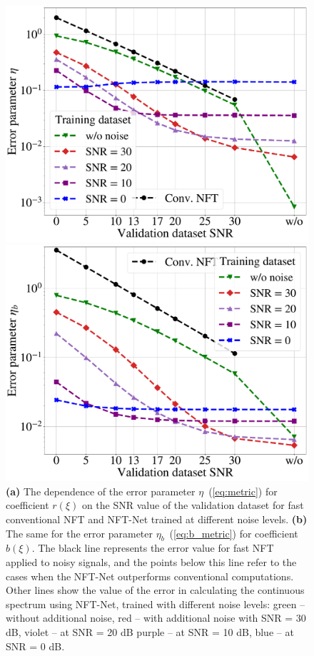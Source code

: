 \begin{figure}[tp]
\centering
\begin{minipage}{.49\textwidth}
  \centering
  \includegraphics[width=1.\linewidth]{images/nn_nft/scirep_nft_r_metric.pdf}
\end{minipage}%
\begin{minipage}{.49\textwidth}
  \centering
  \includegraphics[width=1.\linewidth]{images/nn_nft/scirep_nft_b_metric.pdf}
\end{minipage}
\caption{\textbf{(a)} The dependence of the error parameter $\eta$~(\ref{eq:metric}) for coefficient $r(\xi)$ on the SNR value of the validation dataset for fast conventional NFT and NFT-Net trained at different noise levels. \textbf{(b)} The same for the error parameter $\eta_b$~(\ref{eq:b_metric}) for coefficient $b(\xi)$. The black line represents the error value for fast NFT applied to noisy signals, and the points below this line refer to the cases when the NFT-Net outperforms conventional computations. Other lines show  the value of the error in calculating the continuous spectrum using NFT-Net, trained with different noise levels: green -- without additional noise, red -- with additional noise with SNR = 30 dB, violet -- at SNR = 20 dB purple -- at SNR = 10 dB, blue -- at SNR = 0 dB.}
\label{fig:quality_r_b}
\end{figure}